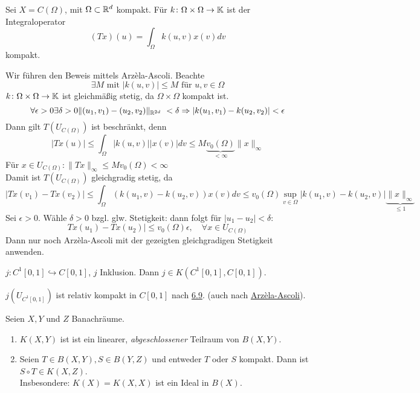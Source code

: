 \begin{beispiel} \label{bsp:7.3}
	Sei $X = C(\Omega)$, mit $\Omega \subset \mathbb{R}^{d}$ kompakt. Für $k \colon \Omega \times \Omega \rightarrow \mathbb{K}$ ist der Integraloperator
		\[ (Tx)(u) = \int_{\Omega} k(u, v) x(v) dv \]
	kompakt.
	\begin{beweis}
		Wir führen den Beweis mittels Arzèla-Ascoli. Beachte
		\[ \exists M \text{ mit } |k(u, v)| \leq M \text{ für } u, v \in \Omega \]
		$k \colon \Omega \times \Omega \rightarrow \mathbb{K}$ ist gleichmä{\ss}ig stetig, da $\Omega \times \Omega$ kompakt ist.
		\[ \forall \epsilon > 0 \exists \delta > 0 \| (u_1, v_1) - (u_2, v_2) \|_{\MdR^{2d}} < \delta \Rightarrow |k(u_1, v_1) - k(u_2, v_2)| < \epsilon \]
		Dann gilt $T(U_{C(\Omega)})$ ist beschränkt, denn
		\[ |Tx(u)| \leq \int_{\Omega} |k(u, v)| |x(v)| dv \leq M \underbrace{v_{0}(\Omega)}_{< \infty} \| x \|_{\infty} \]
		Für $x \in U_{C(\Omega)}: \| Tx \|_{\infty} \leq M v_{0}(\Omega) < \infty$ \\
		Damit ist $T(U_{C(\Omega)})$ gleichgradig stetig, da
		\[ |Tx(v_1) - Tx(v_2)| \leq \int_{\Omega} \left( k(u_1, v) - k(u_2, v) \right) x(v) dv \leq v_{0}(\Omega) \sup_{v \in \Omega} | k(u_1, v) - k(u_2, v) | \underbrace{\| x \|_{\infty}}_{ \leq 1 } \]
		Sei $\epsilon > 0$. Wähle $\delta > 0$ bzgl. glw. Stetigkeit: dann folgt für 	$|u_1 - u_2| < \delta$:
		\[ Tx(u_1) - Tx(u_2) | \leq v_{0}(\Omega) \epsilon, \quad \forall x \in U_{C(\Omega)} \]
		Dann nur noch Arzèla-Ascoli mit der gezeigten gleichgradigen Stetigkeit anwenden.
	\end{beweis}
\end{beispiel}


\begin{beispiel} \label{bsp:7.4}
	$j \colon C^{1}[0, 1] \hookrightarrow C[0, 1]$, $j$ Inklusion. Dann $j \in K(C^{1}[0, 1], C[0, 1])$.
	\begin{beweis}
		$j(U_{C^{1}[0, 1]})$ ist relativ kompakt in $C[0, 1]$ nach \hyperref[]{6.9}. (auch nach \hyperref[satz-6.7-arzelaascoli]{Arzèla-Ascoli}).
	\end{beweis}
\end{beispiel}


\begin{satz} \label{satz:7-5}
	Seien $X, Y$ und $Z$ Banachräume.
	\begin{enumerate}[label=\alph*\upshape)]
		\label{satz:7-5a}
		\item $K(X, Y)$ ist ist ein linearer, \textit{abgeschlossener} Teilraum von $B(X, Y)$.
		\item Seien $T \in B(X, Y), S \in B(Y, Z)$ und entweder $T$ oder $S$ kompakt. Dann ist $S \circ T \in K(X, Z)$. \\
			Insbesondere: $K(X) = K(X, X)$ ist ein Ideal in $B(X)$.
	\end{enumerate}
\end{satz}

